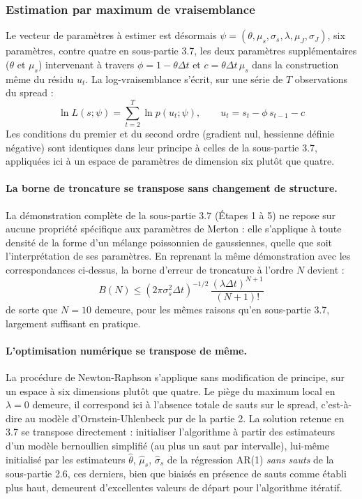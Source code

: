 \documentclass{article}
\begin{document}
\subsubsection*{Estimation par maximum de vraisemblance}
Le vecteur de paramètres à estimer est désormais $\psi = (\theta,\mu_s,\sigma_s,\lambda,\mu_J,\sigma_J)$, six paramètres, contre quatre en sous-partie 3.7, les deux paramètres supplémentaires ($\theta$ et $\mu_s$) intervenant à travers $\phi=1-\theta\Delta t$ et $c=\theta\Delta t\,\mu_s$ dans la construction même du résidu $u_t$. La log-vraisemblance s'écrit, sur une série de $T$ observations du spread :
\begin{equation}
\ln L(s;\psi) = \sum_{t=2}^{T} \ln p(u_t;\psi), \qquad u_t = s_t - \phi\, s_{t-1} - c
\end{equation}
Les conditions du premier et du second ordre (gradient nul, hessienne définie négative) sont identiques dans leur principe à celles de la sous-partie 3.7, appliquées ici à un espace de paramètres de dimension six plutôt que quatre.
\paragraph{La borne de troncature se transpose sans changement de structure.} La démonstration complète de la sous-partie 3.7 (Étapes 1 à 5) ne repose sur aucune propriété spécifique aux paramètres de Merton : elle s'applique à toute densité de la forme d'un mélange poissonnien de gaussiennes, quelle que soit l'interprétation de ses paramètres. En reprenant la même démonstration avec les correspondances ci-dessus, la borne d'erreur de troncature à l'ordre $N$ devient :
\begin{equation}
B(N) \leq \left(2\pi\sigma_s^2\Delta t\right)^{-1/2}\, \frac{(\lambda\Delta t)^{N+1}}{(N+1)!}
\end{equation}
de sorte que $N=10$ demeure, pour les mêmes raisons qu'en sous-partie 3.7, largement suffisant en pratique.
\paragraph{L'optimisation numérique se transpose de même.} La procédure de Newton-Raphson s'applique sans modification de principe, sur un espace à six dimensions plutôt que quatre. Le piège du maximum local en $\lambda=0$ demeure, il correspond ici à l'absence totale de sauts sur le spread, c'est-à-dire au modèle d'Ornstein-Uhlenbeck pur de la partie 2. La solution retenue en 3.7 se transpose directement : initialiser l'algorithme à partir des estimateurs d'un modèle bernoullien simplifié (au plus un saut par intervalle), lui-même initialisé par les estimateurs $\hat\theta$, $\hat\mu_s$, $\hat\sigma_s$ de la régression AR(1) \emph{sans sauts} de la sous-partie 2.6, ces derniers, bien que biaisés en présence de sauts comme établi plus haut, demeurent d'excellentes valeurs de départ pour l'algorithme itératif.
\end{document}
